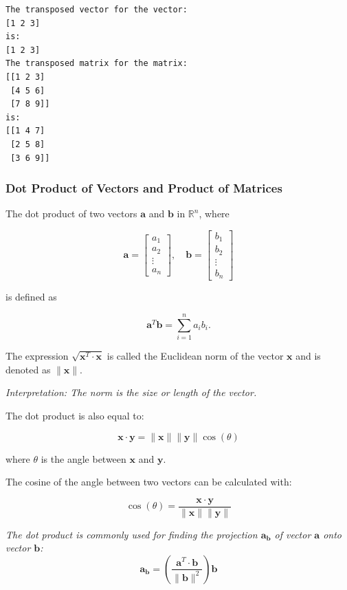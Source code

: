 \documentclass[11pt]{article}
\begin{document}
    \begin{Verbatim}[commandchars=\\\{\}]
The transposed vector for the vector:
[1 2 3]
is:
[1 2 3]
The transposed matrix for the matrix:
[[1 2 3]
 [4 5 6]
 [7 8 9]]
is:
[[1 4 7]
 [2 5 8]
 [3 6 9]]
    \end{Verbatim}

    \newpage

\subsubsection{Dot Product of Vectors and Product of
Matrices}\label{dot-product-of-vectors-and-product-of-matrices}

The dot product of two vectors \(\pmb{a}\) and \(\pmb{b}\) in
\(\mathbb{R}^n\), where

\[
\pmb{a} =
\begin{bmatrix}
a_1 \\
a_2 \\
\vdots \\
a_n
\end{bmatrix}, \quad
\pmb{b} =
\begin{bmatrix}
b_1 \\
b_2 \\
\vdots \\
b_n
\end{bmatrix}
\]

is defined as

\[
\pmb{a}^T \pmb{b} = \sum_{i=1}^{n} a_i b_i.
\]

The expression \(\sqrt{\pmb{x}^{T}\cdot\pmb{x}}\) is called the
Euclidean norm of the vector \(\pmb{x}\) and is denoted as
\(\|\pmb{x}\|\).

\emph{Interpretation: The norm is the size or length of the vector.}

The dot product is also equal to:

\[\pmb{x} \cdot \pmb{y} = \|\pmb{x}\| \|\pmb{y}\| \cos(\theta)\]

where \(\theta\) is the angle between \(\pmb{x}\) and \(\pmb{y}\).

The cosine of the angle between two vectors can be calculated with:

\[\cos(\theta) = \frac{\pmb{x} \cdot \pmb{y}}{\|\pmb{x}\| \|\pmb{y}\|}\]

\emph{The dot product is commonly used for finding the projection
\(\pmb{a_b}\) of vector \(\pmb{a}\) onto vector \(\pmb{b}\):} \[
{\pmb{a_b}} = \left( \frac{\pmb{a}^T \cdot \pmb{b}}{\|\pmb{b}\|^2} \right) \pmb{b}
\]
\end{document}
